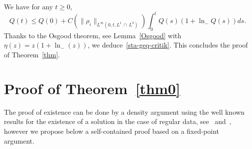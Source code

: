 \documentclass[10pt]{amsart}
\theoremstyle{definition}\newtheorem{defi}[theo]{Definition}\newtheorem{rema}[theo]{Remark}\newtheorem{exam}[theo]{Example}\newtheorem{exem}[theo]{Example}\newtheorem{nota}[theo]{Notation}
\renewcommand{\leq}{\leqslant}
\renewcommand{\geq}{\geqslant}
\begin{document}
We have for any $t\geq 0$,
\begin{equation*}
Q(t) \leq Q(0)+ C\left(\|\rho_i\|_{L^\infty\left(0,t, L^1\,\cap \,L^3\right)}\right)\int_0^t Q(s)(1+\ln_{-} Q(s)) ds.
\end{equation*}
Thanks to the Osgood theorem, see Lemma~\ref{Osgood} with $\eta(z)=z(1+\ln_{-}(z)) $, we deduce~\eqref{sta-geq-critik}. This concludes the proof of Theorem~\ref{thm}.



\section{Proof of Theorem~\ref{thm0}}\label{sec-proof-princi}


The proof of existence can be done by a density argument using the well known results for the existence of a solution in the case of regular data, see~\cite{Hofer} and~\cite{Mecherbet2}, however we propose below a self-contained proof based on a fixed-point argument.
\end{document}
